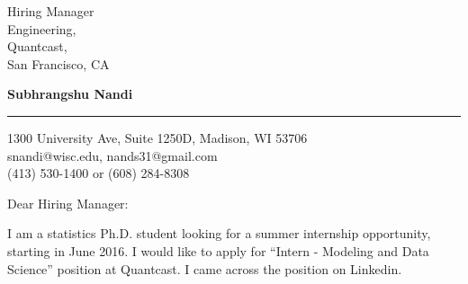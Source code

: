 \documentclass{letter} %
\begin{document}
\signature{Subhrangshu Nandi}           %
\longindentation=0pt                       %
\let\raggedleft\raggedright                %
 
 
\begin{letter}
{Hiring Manager \\
Engineering, \\
Quantcast, \\
San Francisco, CA
}



\begin{flushleft}
{\bf Subhrangshu Nandi}
\end{flushleft}
\medskip\hrule height 1pt
\begin{flushright}
\hfill 1300 University Ave, Suite 1250D, Madison, WI 53706 \\
\hfill snandi@wisc.edu, nands31@gmail.com\\
\hfill (413) 530-1400 or (608) 284-8308
\end{flushright} 
\vfill %

\opening{Dear Hiring Manager:} 
 
\noindent %
I am a statistics Ph.D. student looking for a summer internship opportunity, starting in June 2016. I would like to apply for ``Intern - Modeling and Data Science'' position at Quantcast. I came across the position on Linkedin.
 

\end{letter}
\end{document}
